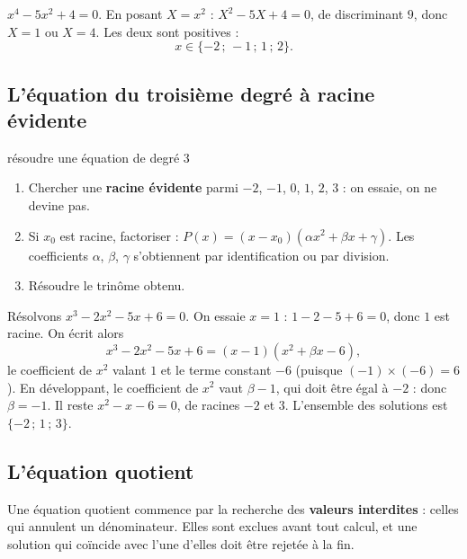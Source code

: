 \begin{exemple}
$x^{4}-5x^{2}+4 = 0$. En posant $X = x^{2}$ : $X^{2}-5X+4 = 0$, de
discriminant $9$, donc $X = 1$ ou $X = 4$. Les deux sont positives :
\[
  x \in \{-2\,;\,-1\,;\,1\,;\,2\}.
\]
\end{exemple}

\subsection{L'équation du troisième degré à racine évidente}

\begin{methode}{résoudre une équation de degré 3}
\begin{enumerate}[label=\textbf{\arabic*.}, leftmargin=*, itemsep=0.15em]
  \item Chercher une \textbf{racine évidente} parmi $-2$, $-1$, $0$, $1$,
        $2$, $3$ : on essaie, on ne devine pas.
  \item Si $x_{0}$ est racine, factoriser :
        $P(x) = (x-x_{0})\left(\alpha x^{2}+\beta x+\gamma\right)$. Les
        coefficients $\alpha$, $\beta$, $\gamma$ s'obtiennent par
        identification ou par division.
  \item Résoudre le trinôme obtenu.
\end{enumerate}
\end{methode}

\begin{exemple}
Résolvons $x^{3}-2x^{2}-5x+6 = 0$. On essaie $x = 1$ :
$1-2-5+6 = 0$, donc $1$ est racine. On écrit alors
\[
  x^{3}-2x^{2}-5x+6 = (x-1)\left(x^{2}+\beta x-6\right),
\]
le coefficient de $x^{2}$ valant $1$ et le terme constant $-6$ (puisque
$(-1)\times(-6) = 6$). En développant, le coefficient de $x^{2}$ vaut
$\beta-1$, qui doit être égal à $-2$ : donc $\beta = -1$. Il reste
$x^{2}-x-6 = 0$, de racines $-2$ et $3$. L'ensemble des solutions est
$\{-2\,;\,1\,;\,3\}$.
\end{exemple}

\subsection{L'équation quotient}

\begin{avertissement}
Une équation quotient commence par la recherche des \textbf{valeurs
interdites} : celles qui annulent un dénominateur. Elles sont exclues avant
tout calcul, et une solution qui coïncide avec l'une d'elles doit être
rejetée à la fin.
\end{avertissement}

